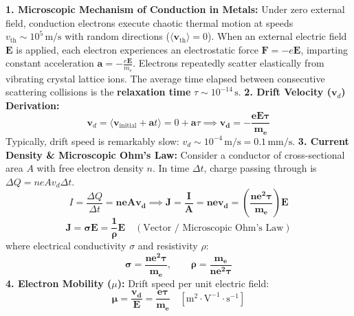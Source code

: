 \documentclass[10pt,twoside,openright]{book}
\begin{document}
\begin{conceptbox}
\textbf{1. Microscopic Mechanism of Conduction in Metals:}
Under zero external field, conduction electrons execute chaotic thermal motion at speeds $v_{\text{th}} \sim 10^5\,\mathrm{m/s}$ with random directions ($\langle \mathbf{v}_{\text{th}} \rangle = 0$).
When an external electric field $\mathbf{E}$ is applied, each electron experiences an electrostatic force $\mathbf{F} = -e\mathbf{E}$, imparting constant acceleration $\mathbf{a} = -\frac{e\mathbf{E}}{m_e}$.
Electrons repeatedly scatter elastically from vibrating crystal lattice ions. The average time elapsed between consecutive scattering collisions is the \textbf{relaxation time} $\tau \sim 10^{-14}\,\mathrm{s}$.
\textbf{2. Drift Velocity ($\mathbf{v}_d$) Derivation:}
\begin{equation}
  \mathbf{v}_d = \langle \mathbf{v}_{\text{initial}} + \mathbf{a} t \rangle = 0 + \mathbf{a}\tau \implies \mathbf{\mathbf{v}_d = -\frac{e \mathbf{E} \tau}{m_e}}
\end{equation}
Typically, drift speed is remarkably slow: $v_d \sim 10^{-4}\,\mathrm{m/s} = 0.1\,\mathrm{mm/s}$.
\textbf{3. Current Density \& Microscopic Ohm's Law:}
Consider a conductor of cross-sectional area $A$ with free electron density $n$. In time $\Delta t$, charge passing through is $\Delta Q = n e A v_d \Delta t$.
\begin{equation}
  I = \frac{\Delta Q}{\Delta t} = \mathbf{n e A v_d} \implies \mathbf{J = \frac{I}{A} = n e v_d = \left(\frac{n e^2 \tau}{m_e}\right) E}
\end{equation}
\begin{equation}
  \mathbf{\mathbf{J} = \sigma \mathbf{E} = \frac{1}{\rho}\mathbf{E}} \quad (\text{Vector / Microscopic Ohm's Law})
\end{equation}
where electrical conductivity $\sigma$ and resistivity $\rho$:
\begin{equation}
  \mathbf{\sigma = \frac{n e^2 \tau}{m_e}}, \qquad \mathbf{\rho = \frac{m_e}{n e^2 \tau}}
\end{equation}
\textbf{4. Electron Mobility ($\mu$):}
Drift speed per unit electric field:
\begin{equation}
  \mathbf{\mu = \frac{v_d}{E} = \frac{e \tau}{m_e}} \quad [\mathrm{m}^2\cdot\mathrm{V}^{-1}\cdot\mathrm{s}^{-1}]
\end{equation}
\end{conceptbox}
\end{document}
